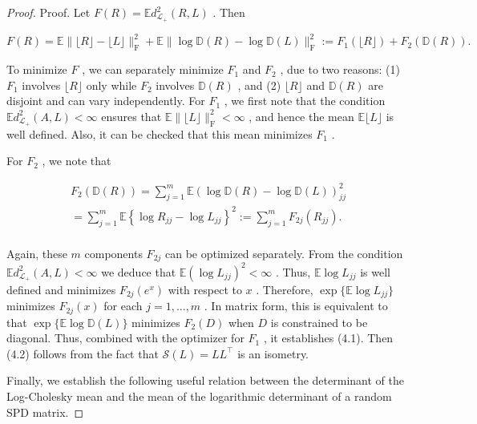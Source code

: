 \documentclass[11pt]{article}
\begin{document}
\begin{proof}
Proof. Let  $F(R) = \mathbb{E}d_{\mathcal{L}_+}^2 (R,L)$ . Then

$$
F (R) = \mathbb {E} \| \lfloor R \rfloor - \lfloor L \rfloor \| _ {\mathrm {F}} ^ {2} + \mathbb {E} \| \log \mathbb {D} (R) - \log \mathbb {D} (L) \| _ {\mathrm {F}} ^ {2} := F _ {1} (\lfloor R \rfloor) + F _ {2} (\mathbb {D} (R)).
$$

To minimize  $F$ , we can separately minimize  $F_{1}$  and  $F_{2}$ , due to two reasons: (1)  $F_{1}$  involves  $\lfloor R\rfloor$  only while  $F_{2}$  involves  $\mathbb{D}(R)$ , and (2)  $\lfloor R\rfloor$  and  $\mathbb{D}(R)$  are disjoint and can vary independently. For  $F_{1}$ , we first note that the condition  $\mathbb{E}d_{\mathcal{L}_{+}}^{2}(A,L) < \infty$  ensures that  $\mathbb{E}\| \lfloor L\rfloor \|_{\mathrm{F}}^2 < \infty$ , and hence the mean  $\mathbb{E}\lfloor L\rfloor$  is well defined. Also, it can be checked that this mean minimizes  $F_{1}$ .

For  $F_{2}$ , we note that

$$
\begin{array}{l} F _ {2} (\mathbb {D} (R)) = \sum_ {j = 1} ^ {m} \mathbb {E} (\log \mathbb {D} (R) - \log \mathbb {D} (L)) _ {j j} ^ {2} \\ = \sum_ {j = 1} ^ {m} \mathbb {E} \left\{\log R _ {j j} - \log L _ {j j} \right\} ^ {2} := \sum_ {j = 1} ^ {m} F _ {2 j} \left(R _ {j j}\right). \\ \end{array}
$$

Again, these  $m$  components  $F_{2j}$  can be optimized separately. From the condition  $\mathbb{E}d_{\mathcal{L}_+}^2 (A,L) < \infty$  we deduce that  $\mathbb{E}(\log L_{jj})^2 < \infty$ . Thus,  $\mathbb{E}\log L_{jj}$  is well defined and minimizes  $F_{2j}(e^{x})$  with respect to  $x$ . Therefore,  $\exp \{\mathbb{E}\log L_{jj}\}$  minimizes  $F_{2j}(x)$  for each  $j = 1,\ldots,m$ . In matrix form, this is equivalent to that  $\exp \{\mathbb{E}\log \mathbb{D}(L)\}$  minimizes  $F_{2}(D)$  when  $D$  is constrained to be diagonal. Thus, combined with the optimizer for  $F_{1}$ , it establishes (4.1). Then (4.2) follows from the fact that  $\mathcal{S}(L) = LL^{\top}$  is an isometry.

Finally, we establish the following useful relation between the determinant of the Log-Cholesky mean and the mean of the logarithmic determinant of a random SPD matrix.

\end{proof}
\end{document}

